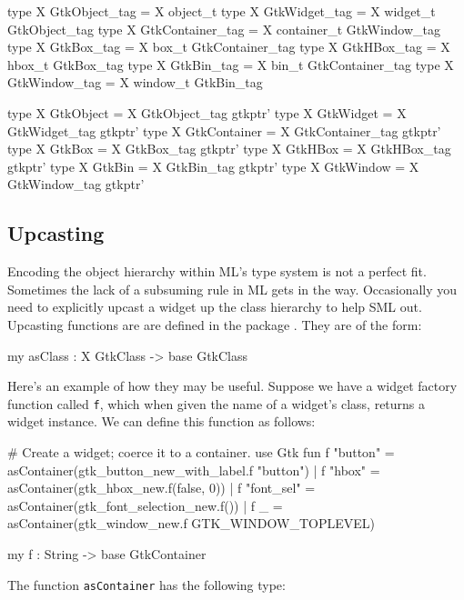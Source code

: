 \documentclass{article}
\begin{document}
    \begin{smldisp}
       type X GtkObject_tag    = X object_t
       type X GtkWidget_tag    = X widget_t GtkObject_tag 
       type X GtkContainer_tag = X container_t GtkWindow_tag
       type X GtkBox_tag       = X box_t GtkContainer_tag
       type X GtkHBox_tag      = X hbox_t GtkBox_tag
       type X GtkBin_tag       = X bin_t GtkContainer_tag
       type X GtkWindow_tag    = X window_t GtkBin_tag

       type X GtkObject    = X GtkObject_tag gtkptr'
       type X GtkWidget    = X GtkWidget_tag gtkptr'
       type X GtkContainer = X GtkContainer_tag gtkptr'
       type X GtkBox       = X GtkBox_tag gtkptr'
       type X GtkHBox      = X GtkHBox_tag gtkptr'
       type X GtkBin       = X GtkBin_tag gtkptr'
       type X GtkWindow    = X GtkWindow_tag gtkptr'
    \end{smldisp}

\subsection{Upcasting}

 Encoding the object hierarchy within ML's type system is not 
 a perfect fit.  Sometimes the lack of a subsuming rule in ML gets in the way.
 Occasionally you need to explicitly upcast a widget up the class hierarchy
 to help SML out.  Upcasting functions are 
   are defined in the package .  They are of the form:

   \begin{smldisp}
     my asClass : X GtkClass -> base GtkClass
   \end{smldisp}

   Here's an example of how they may be useful.  Suppose we have a widget
factory function called \verb|f|, which when 
given the name of a widget's class, returns a widget instance.
We can define this function as follows:

 
    \begin{smldisp} 
   #  Create a widget; coerce it to a container. 
   use Gtk
   fun 
       f "button"   = asContainer(gtk_button_new_with_label.f "button")
     | f "hbox"     = asContainer(gtk_hbox_new.f(false, 0))
     | f "font_sel" = asContainer(gtk_font_selection_new.f())
     | f _          = asContainer(gtk_window_new.f GTK_WINDOW_TOPLEVEL)

   my f : String -> base GtkContainer
    \end{smldisp} 

   The function \verb|asContainer| has the following type:
\end{document}

